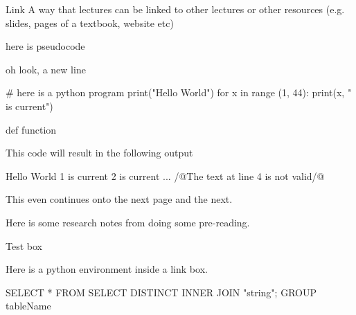 \documentclass[a4paper, 11pt]{report}
\begin{document}
    

    \begin{link}{Link}
        A way that lectures can be linked to other lectures or other resources (e.g. slides, pages of a textbook, website etc)
    \end{link}
\begin{pseudo}
here is pseudocode

oh look, a new line
\end{pseudo}

\begin{python}
# here is a python program
print("Hello World")
for x in range (1, 44):
    print(x, " is current")

def function
\end{python}
This code will result in the following output
\begin{pseudo*}
Hello World
1 is current
2 is current
...
/@The text at line 4 is not valid/@
\end{pseudo*}

    \newpage
    This even continues onto the next page
    \newpage
    and the next.




    Here is some research notes from doing some pre-reading.


    \begin{link}{Test box}
        \begin{python}
            Here is a python environment inside a link box.
        \end{python}
    \end{link}

    \begin{sql}
SELECT * FROM
SELECT DISTINCT
INNER JOIN
"string";
GROUP
tableName
\end{sql}
\end{document}
